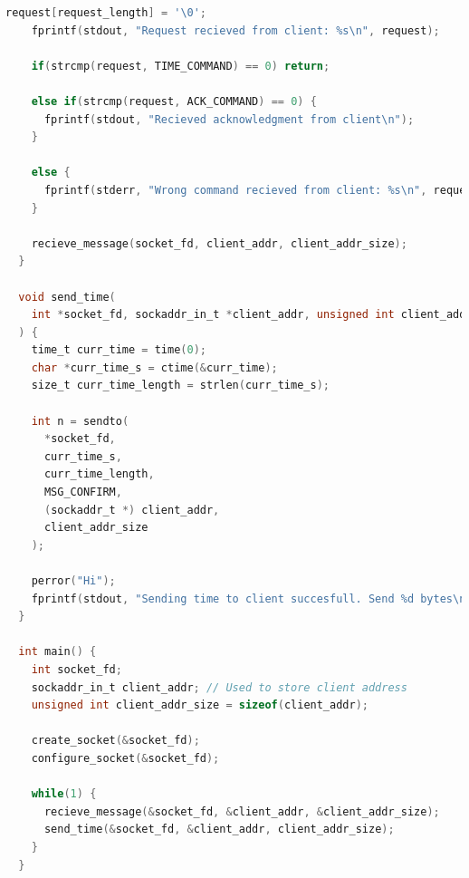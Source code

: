 \begin{lstlisting}[language=C]
    request[request_length] = '\0';
    fprintf(stdout, "Request recieved from client: %s\n", request);
  
    if(strcmp(request, TIME_COMMAND) == 0) return;
    
    else if(strcmp(request, ACK_COMMAND) == 0) { 
      fprintf(stdout, "Recieved acknowledgment from client\n");
    }
  
    else {
      fprintf(stderr, "Wrong command recieved from client: %s\n", request);
    }
    
    recieve_message(socket_fd, client_addr, client_addr_size);
  }
  
  void send_time(
    int *socket_fd, sockaddr_in_t *client_addr, unsigned int client_addr_size
  ) {
    time_t curr_time = time(0);
    char *curr_time_s = ctime(&curr_time);
    size_t curr_time_length = strlen(curr_time_s);
  
    int n = sendto(
      *socket_fd,
      curr_time_s,
      curr_time_length,
      MSG_CONFIRM,
      (sockaddr_t *) client_addr,
      client_addr_size
    );
  
    perror("Hi");
    fprintf(stdout, "Sending time to client succesfull. Send %d bytes\n", n);
  }
  
  int main() {
    int socket_fd;
    sockaddr_in_t client_addr; // Used to store client address
    unsigned int client_addr_size = sizeof(client_addr);
  
    create_socket(&socket_fd);
    configure_socket(&socket_fd);
  
    while(1) {
      recieve_message(&socket_fd, &client_addr, &client_addr_size);
      send_time(&socket_fd, &client_addr, client_addr_size);
    }
  }
\end{lstlisting}

